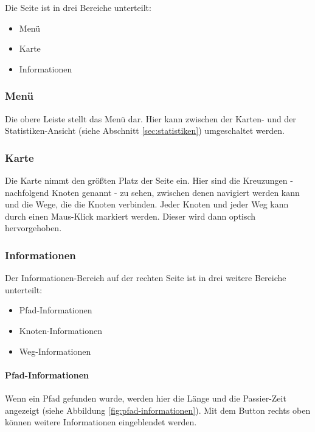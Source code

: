 Die Seite ist in drei Bereiche unterteilt:

\begin{itemize}
  \item Menü
  \item Karte
  \item Informationen
\end{itemize}

\subsubsection{Menü}
\label{sec:menue}

Die obere Leiste stellt das Menü dar.
Hier kann zwischen der Karten- und der Statistiken-Ansicht (siehe Abschnitt \ref{sec:statistiken}) umgeschaltet werden.

\subsubsection{Karte}
\label{sec:karte}

Die Karte nimmt den größten Platz der Seite ein.
Hier sind die Kreuzungen - nachfolgend Knoten genannt - zu sehen, zwischen denen navigiert werden kann und die Wege, die die Knoten verbinden.
Jeder Knoten und jeder Weg kann durch einen Maus-Klick markiert werden.
Dieser wird dann optisch hervorgehoben.

\subsubsection{Informationen}
\label{sec:informationen}

Der Informationen-Bereich auf der rechten Seite ist in drei weitere Bereiche unterteilt:

\begin{itemize}
  \item Pfad-Informationen
  \item Knoten-Informationen
  \item Weg-Informationen
\end{itemize}

\paragraph{Pfad-Informationen}
\label{sec:pfad-informationen}

Wenn ein Pfad gefunden wurde, werden hier die Länge und die Passier-Zeit angezeigt (siehe Abbildung \ref{fig:pfad-informationen}).
Mit dem Button rechts oben können weitere Informationen eingeblendet werden.

